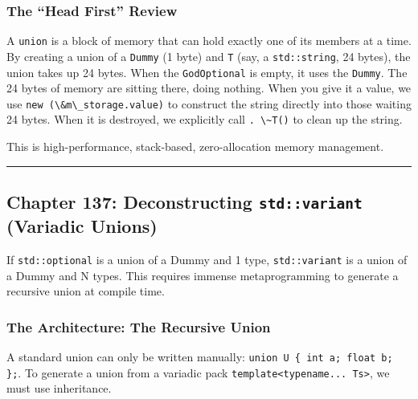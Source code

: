 \hypertarget{the-head-first-review-1}{%
\subsubsection{The ``Head First''
Review}\label{the-head-first-review-1}}

A \passthrough{\lstinline!union!} is a block of memory that can hold
exactly one of its members at a time. By creating a union of a
\passthrough{\lstinline!Dummy!} (1 byte) and \passthrough{\lstinline!T!}
(say, a \passthrough{\lstinline!std::string!}, 24 bytes), the union
takes up 24 bytes. When the \passthrough{\lstinline!GodOptional!} is
empty, it uses the \passthrough{\lstinline!Dummy!}. The 24 bytes of
memory are sitting there, doing nothing. When you give it a value, we
use \passthrough{\lstinline!new (\&m\_storage.value)!} to construct the
string directly into those waiting 24 bytes. When it is destroyed, we
explicitly call \passthrough{\lstinline!. \~T()!} to clean up the
string.

This is high-performance, stack-based, zero-allocation memory
management.

\begin{center}\rule{0.5\linewidth}{0.5pt}\end{center}

\hypertarget{chapter-137-deconstructing-stdvariant-variadic-unions}{%
\subsection{\texorpdfstring{Chapter 137: Deconstructing
\texttt{std::variant} (Variadic
Unions)}{Chapter 137: Deconstructing std::variant (Variadic Unions)}}\label{chapter-137-deconstructing-stdvariant-variadic-unions}}

If \passthrough{\lstinline!std::optional!} is a union of a Dummy and 1
type, \passthrough{\lstinline!std::variant!} is a union of a Dummy and N
types. This requires immense metaprogramming to generate a recursive
union at compile time.

\hypertarget{the-architecture-the-recursive-union}{%
\subsubsection{The Architecture: The Recursive
Union}\label{the-architecture-the-recursive-union}}

A standard union can only be written manually:
\passthrough{\lstinline!union U \{ int a; float b; \};!}. To generate a
union from a variadic pack
\passthrough{\lstinline!template<typename... Ts>!}, we must use
inheritance.

